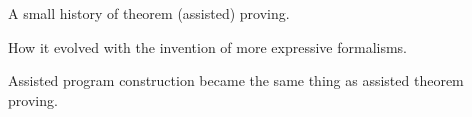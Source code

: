 \begin{TODO}
  \item A small history of theorem (assisted) proving.
  \item How it evolved with the invention of more expressive formalisms.
  \item Assisted program construction became the same thing as assisted theorem proving.
\end{TODO}
